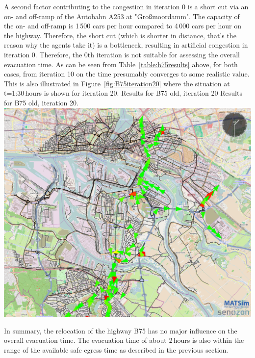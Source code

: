 {}
%
A second factor contributing to the congestion in iteration 0 is a short cut via an on- and off-ramp of the Autobahn A253 at "Gro{\ss}moordamm". The capacity of the on- and off-ramp is 1\,500 cars per hour compared to 4\,000 cars per hour on the highway. Therefore, the short cut (which is shorter in distance, that's the reason why the agents take it) is a bottleneck, resulting in artificial congestion in iteration 0.
Therefore, the 0th iteration is not suitable for assessing the overall evacuation time. As can be seen from Table~\ref{table:b75results} above, for both cases, from iteration 10 on the time presumably converges to some realistic value. This is also illustrated in Figure~\ref{fig:B75iteration20} where the situation at t=1:30\,hours is shown for iteration 20.
%
\createfigure%
{Results for B75 old, iteration 20}%
{Results for B75 old, iteration 20.}%
{\label{fig:B75iteration20}}%
{\includegraphics[width=0.7\linewidth]{using/figures/B75iteration20}}%
{}

In summary, the relocation of the highway B75 has no major influence on the overall evacuation time. The evacuation time of about 2\,hours is also within the range of the available safe egress time as described in the previous section. 

